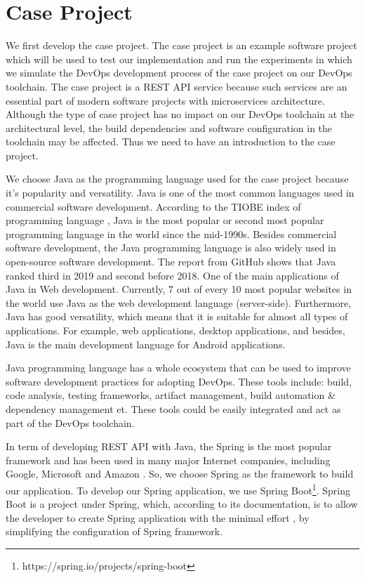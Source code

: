 \section{Case Project}
We first develop the case project. The case project is an example software project which will be used to test our implementation and run the experiments in which we simulate the DevOps development process of the case project on our DevOps toolchain. 
The case project is a REST API service because such services are an essential part of modern software projects with microservices architecture. 
Although the type of case project has no impact on our DevOps toolchain at the architectural level, the build dependencies and software configuration in the toolchain may be affected. Thus we need to have an introduction to the case project.
\par
We choose Java as the programming language used for the case project because it's popularity and versatility.
Java is one of the most common languages used in commercial software development. According to the TIOBE index of programming language \cite{indexTIO42:online}, Java is the most popular or second most popular programming language in the world since the mid-1990s. Besides commercial software development, the Java programming language is also widely used in open-source software development. The report \cite{TheState3:online} from GitHub shows that Java ranked third in 2019 and second before 2018. One of the main applications of Java in Web development. Currently, 7 out of every 10 \cite{Programm17:online} most popular websites in the world use Java as the web development language (server-side). Furthermore, Java has good versatility, which means that it is suitable for almost all types of applications. For example, web applications, desktop applications, and besides, Java is the main development language for Android applications.
\par
Java programming language has a whole ecosystem that can be used to improve software development practices for adopting DevOps. These tools include: build, code analysis, testing frameworks, artifact management, build automation \& dependency management et. These tools could be easily integrated and act as part of the DevOps toolchain.
\par
In term of developing REST API with Java, the Spring is the most popular framework and has been used in many major Internet companies, including Google, Microsoft and Amazon \cite{SpringWh14:online}.
So, we choose Spring as the framework to build our application. To develop our Spring application, we use Spring Boot\footnote{https://spring.io/projects/spring-boot}. Spring Boot is a project under Spring, which, according to its documentation, is to allow the developer to create Spring application with the minimal effort \cite{SpringBo84:online}, by simplifying the configuration of Spring framework.
